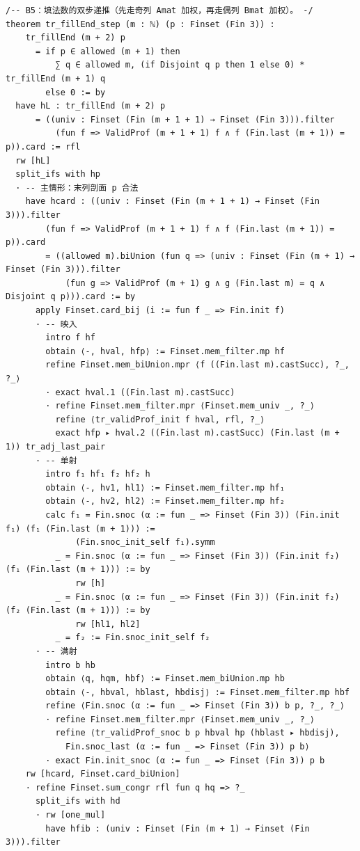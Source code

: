 \documentclass[11pt]{article}
\begin{document}
\begin{lstlisting}
/-- B5：填法数的双步递推（先走奇列 Amat 加权，再走偶列 Bmat 加权）。 -/
theorem tr_fillEnd_step (m : ℕ) (p : Finset (Fin 3)) :
    tr_fillEnd (m + 2) p
      = if p ∈ allowed (m + 1) then
          ∑ q ∈ allowed m, (if Disjoint q p then 1 else 0) * tr_fillEnd (m + 1) q
        else 0 := by
  have hL : tr_fillEnd (m + 2) p
      = ((univ : Finset (Fin (m + 1 + 1) → Finset (Fin 3))).filter
          (fun f => ValidProf (m + 1 + 1) f ∧ f (Fin.last (m + 1)) = p)).card := rfl
  rw [hL]
  split_ifs with hp
  · -- 主情形：末列剖面 p 合法
    have hcard : ((univ : Finset (Fin (m + 1 + 1) → Finset (Fin 3))).filter
        (fun f => ValidProf (m + 1 + 1) f ∧ f (Fin.last (m + 1)) = p)).card
        = ((allowed m).biUnion (fun q => (univ : Finset (Fin (m + 1) → Finset (Fin 3))).filter
            (fun g => ValidProf (m + 1) g ∧ g (Fin.last m) = q ∧ Disjoint q p))).card := by
      apply Finset.card_bij (i := fun f _ => Fin.init f)
      · -- 映入
        intro f hf
        obtain ⟨-, hval, hfp⟩ := Finset.mem_filter.mp hf
        refine Finset.mem_biUnion.mpr ⟨f ((Fin.last m).castSucc), ?_, ?_⟩
        · exact hval.1 ((Fin.last m).castSucc)
        · refine Finset.mem_filter.mpr ⟨Finset.mem_univ _, ?_⟩
          refine ⟨tr_validProf_init f hval, rfl, ?_⟩
          exact hfp ▸ hval.2 ((Fin.last m).castSucc) (Fin.last (m + 1)) tr_adj_last_pair
      · -- 单射
        intro f₁ hf₁ f₂ hf₂ h
        obtain ⟨-, hv1, hl1⟩ := Finset.mem_filter.mp hf₁
        obtain ⟨-, hv2, hl2⟩ := Finset.mem_filter.mp hf₂
        calc f₁ = Fin.snoc (α := fun _ => Finset (Fin 3)) (Fin.init f₁) (f₁ (Fin.last (m + 1))) :=
              (Fin.snoc_init_self f₁).symm
          _ = Fin.snoc (α := fun _ => Finset (Fin 3)) (Fin.init f₂) (f₁ (Fin.last (m + 1))) := by
              rw [h]
          _ = Fin.snoc (α := fun _ => Finset (Fin 3)) (Fin.init f₂) (f₂ (Fin.last (m + 1))) := by
              rw [hl1, hl2]
          _ = f₂ := Fin.snoc_init_self f₂
      · -- 满射
        intro b hb
        obtain ⟨q, hqm, hbf⟩ := Finset.mem_biUnion.mp hb
        obtain ⟨-, hbval, hblast, hbdisj⟩ := Finset.mem_filter.mp hbf
        refine ⟨Fin.snoc (α := fun _ => Finset (Fin 3)) b p, ?_, ?_⟩
        · refine Finset.mem_filter.mpr ⟨Finset.mem_univ _, ?_⟩
          refine ⟨tr_validProf_snoc b p hbval hp (hblast ▸ hbdisj),
            Fin.snoc_last (α := fun _ => Finset (Fin 3)) p b⟩
        · exact Fin.init_snoc (α := fun _ => Finset (Fin 3)) p b
    rw [hcard, Finset.card_biUnion]
    · refine Finset.sum_congr rfl fun q hq => ?_
      split_ifs with hd
      · rw [one_mul]
        have hfib : (univ : Finset (Fin (m + 1) → Finset (Fin 3))).filter

\end{lstlisting}
\end{document}
